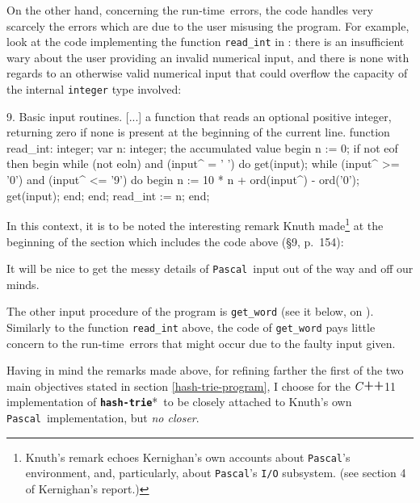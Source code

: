 \documentclass[a4paper,11pt]{article}
\renewcommand{\=}{\protect\nobreakdash-\hspace{0pt}}
\renewcommand{\~}{\protect\nobreakdash--\hspace{0pt}}
\newcommand{\plusplus}{\textbf{\raisebox{1pt}{++}}}
\newcommand{\cplusplus}{$C\plusplus$}
\newcommand{\pascal}{\code{Pascal}}
\newcommand{\hashtrie}{{\tt\textbf{hash-trie}}}
\newcommand\hashtrie*{\emph{hash\=trie}}
\newcommand{\code}[1]{{\tt{#1}}}
\newcommand\code*[1]{\mbox{\code{#1}}}
\newcommand{\pg}[1]{p.~#1}
\newcommand{\pag}[1]{page~#1}
\newcommand{\para}[1]{\mbox{\S\hspace{1pt}#1}}
\newcommand{\parapag}[3][]{%
	\ifthenelse{\not\equal{#1}{}}{%
		\para{#2}, \emph{#1}, on \pag{#3}%
	}{%
		\para{#2} on \pag{#3}%
	}%
}
\newcommand{\parapg}[2]{\para{#1}, \pg{#2}}
\newcommand{\runtime}{run\=time}
\begin{document}
On the other hand, concerning the \runtime\ errors, the code handles
very scarcely the errors which are due to the user misusing the program.
For example, look at the code implementing the function \code{read\_int}
in \parapag{9}{154}: there is an insufficient wary about the user providing
an invalid numerical input, and there is none with regards to an otherwise
valid numerical input that could overflow the capacity of the internal
\code{integer} type involved: 
%
\begin{paslisting}
{ 9. Basic input routines. [...] a function
  that reads an optional positive integer,
  returning zero if none is present at the
  beginning of the current line. }
function read_int: integer;
var n: integer; { the accumulated value }
begin
  n := 0;
  if not eof then
  begin
    while (not eoln) and (input^ = ' ') do
      get(input);
    while (input^ >= '0') and (input^ <= '9') do
    begin
      n := 10 * n + ord(input^) - ord('0');
      get(input);
    end;
  end;
  read_int := n;
end;
\end{paslisting}
%
In this context, it is to be noted the interesting remark Knuth made\footnote{%
Knuth's remark echoes Kernighan's own accounts about \pascal's environment, and,
particularly, about \pascal's \code{I/O} subsystem. (see section 4 of Kernighan's
report.)} at the beginning of the section which includes the code above
(\parapg{9}{154}):
%
\begin{quoting}
It will be nice to get the messy details of \pascal\ input out of the way
and off our minds.
\end{quoting}
%
The other input procedure of the program is \code{get\_word} (see it
below, on ). Similarly to the function \code{read\_int}
above, the code of \code{get\_word} pays little concern to the \runtime\ errors
that might occur due to the faulty input given.

Having in mind the remarks made above, for refining farther the first of the
two main objectives stated in section \ref{hash-trie-program}, I choose for
the \cplusplus11 implementation of \hashtrie*\ to be closely attached
to Knuth's own \pascal\ implementation, but \emph{no closer}.
\end{document}
